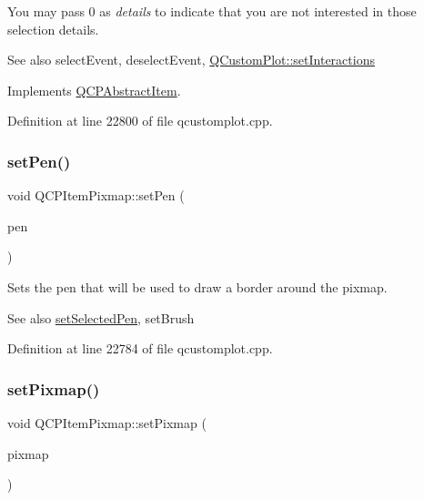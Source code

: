 You may pass 0 as {\itshape details} to indicate that you are not interested in those selection details.

\begin{DoxySeeAlso}{See also}
select\+Event, deselect\+Event, \hyperlink{class_q_custom_plot_a5ee1e2f6ae27419deca53e75907c27e5}{Q\+Custom\+Plot\+::set\+Interactions} 
\end{DoxySeeAlso}


Implements \hyperlink{class_q_c_p_abstract_item_a96d522d10ffc0413b9a366c6f7f0476b}{Q\+C\+P\+Abstract\+Item}.



Definition at line 22800 of file qcustomplot.\+cpp.

\mbox{\label{class_q_c_p_item_pixmap_acdade1305edb4b5cae14f97fd132065f}} 
\subsubsection{\texorpdfstring{set\+Pen()}{setPen()}}
{\footnotesize\ttfamily void Q\+C\+P\+Item\+Pixmap\+::set\+Pen (\begin{DoxyParamCaption}\item[{const Q\+Pen \&}]{pen }\end{DoxyParamCaption})}

Sets the pen that will be used to draw a border around the pixmap.

\begin{DoxySeeAlso}{See also}
\hyperlink{class_q_c_p_item_pixmap_afc5e479e88e53740176ce77cb70dd67a}{set\+Selected\+Pen}, set\+Brush 
\end{DoxySeeAlso}


Definition at line 22784 of file qcustomplot.\+cpp.

\mbox{\label{class_q_c_p_item_pixmap_a726b69ea4025edf48f9b29b6450548a7}} 
\subsubsection{\texorpdfstring{set\+Pixmap()}{setPixmap()}}
{\footnotesize\ttfamily void Q\+C\+P\+Item\+Pixmap\+::set\+Pixmap (\begin{DoxyParamCaption}\item[{const Q\+Pixmap \&}]{pixmap }\end{DoxyParamCaption})}

